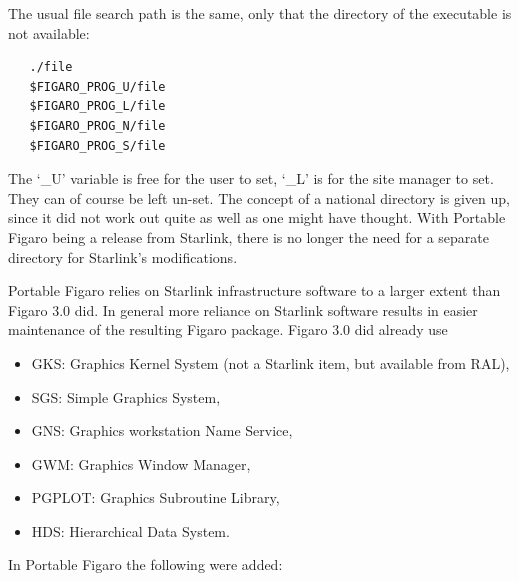 \documentclass[11pt,twoside]{article}
\begin{document}
   The usual file search path is the same, only that the directory of
   the executable is not available:

\begin{verbatim}
   ./file
   $FIGARO_PROG_U/file
   $FIGARO_PROG_L/file
   $FIGARO_PROG_N/file
   $FIGARO_PROG_S/file
\end{verbatim}

   The `\_U' variable is free for the user to set, `\_L' is for the site
   manager to set. They can of course be left un-set.  The concept of a
   national directory is given up, since it did not work out quite as
   well as one might have thought. With Portable Figaro being a release
   from Starlink, there is no longer the need for a separate directory
   for Starlink's modifications.

   Portable Figaro relies on Starlink infrastructure software to a
   larger extent than Figaro 3.0 did.  In general more reliance on
   Starlink software results in easier maintenance of the resulting
   Figaro package. Figaro 3.0 did already use

\begin{itemize}
\item GKS: Graphics Kernel System (not a Starlink item, but available from RAL),
\item SGS: Simple Graphics System,
\item GNS: Graphics workstation Name Service,
\item GWM: Graphics Window Manager,
\item PGPLOT: Graphics Subroutine Library,
\item HDS: Hierarchical Data System.
\end{itemize}

In Portable Figaro the following were added:
\end{document}
